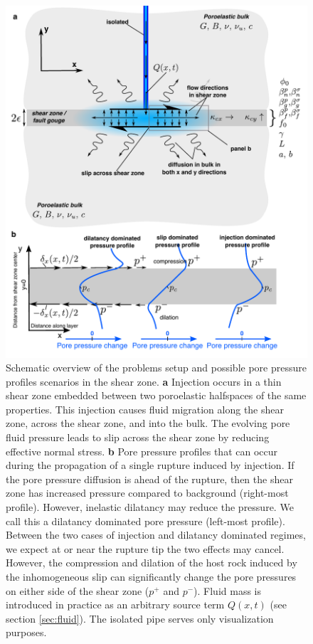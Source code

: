 \documentclass[draft]{agujournal2019}
\begin{document}
\begin{figure}[H]
\includegraphics[scale = 0.85]{Figures/schema2.pdf} %
\caption{Schematic overview of the problems setup and possible pore pressure profiles scenarios in the shear zone. {\bf a} Injection occurs in a thin shear zone embedded between two poroelastic halfspaces of the same properties. This injection causes fluid migration along the shear zone, across the shear zone, and into the bulk. The evolving pore fluid pressure leads to slip across the shear zone by reducing effective normal stress. {\bf b} Pore pressure profiles that can occur during the propagation of a single rupture induced by injection. If the pore pressure diffusion is ahead of the rupture, then the shear zone has increased pressure compared to background (right-most profile). However, inelastic dilatancy may reduce the pressure. We call this a dilatancy dominated pore pressure (left-most profile). Between the two cases of injection and dilatancy dominated regimes, we expect at or near the rupture tip the two effects may cancel. However, the compression and dilation of the host rock induced by the inhomogeneous slip can significantly change the pore pressures on either side of the shear zone ($p^+$ and $p^-$). Fluid mass is introduced in practice as an arbitrary source term $Q(x,t)$ (see section \ref{sec:fluid}). The isolated pipe serves only visualization purposes.}
\label{fig:schema}
\end{figure}
\end{document}
